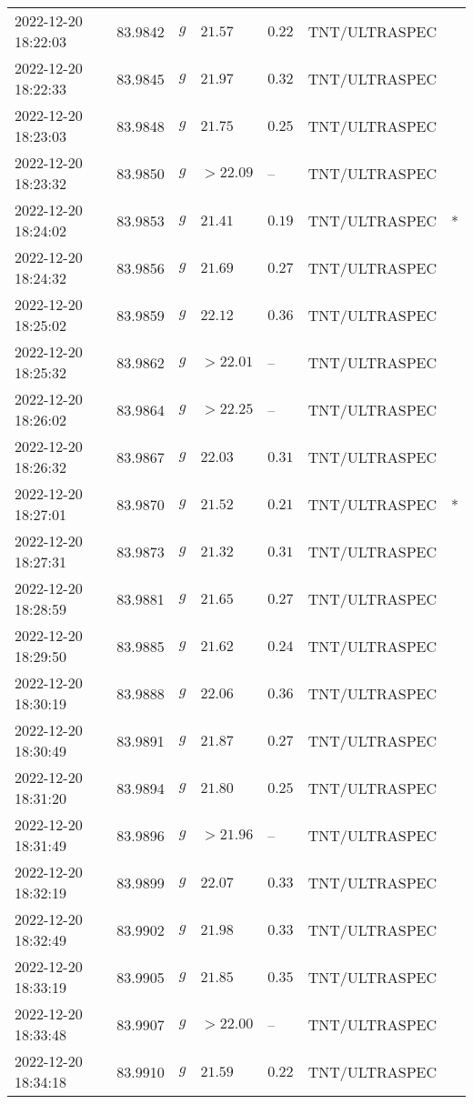 \documentclass{nature_plusfigure}
\begin{document}
\begin{supplement}
\begin{center}
\begin{longtable}{lllllll}
2022-12-20 18:22:03 & 83.9842 & $g$ & $21.57$ & $0.22$ & TNT/ULTRASPEC &  \\ 
2022-12-20 18:22:33 & 83.9845 & $g$ & $21.97$ & $0.32$ & TNT/ULTRASPEC &  \\ 
2022-12-20 18:23:03 & 83.9848 & $g$ & $21.75$ & $0.25$ & TNT/ULTRASPEC &  \\ 
2022-12-20 18:23:32 & 83.9850 & $g$ & $>22.09$ & -- & TNT/ULTRASPEC &  \\ 
2022-12-20 18:24:02 & 83.9853 & $g$ & $21.41$ & $0.19$ & TNT/ULTRASPEC & * \\ 
2022-12-20 18:24:32 & 83.9856 & $g$ & $21.69$ & $0.27$ & TNT/ULTRASPEC &  \\ 
2022-12-20 18:25:02 & 83.9859 & $g$ & $22.12$ & $0.36$ & TNT/ULTRASPEC &  \\ 
2022-12-20 18:25:32 & 83.9862 & $g$ & $>22.01$ & -- & TNT/ULTRASPEC &  \\ 
2022-12-20 18:26:02 & 83.9864 & $g$ & $>22.25$ & -- & TNT/ULTRASPEC &  \\ 
2022-12-20 18:26:32 & 83.9867 & $g$ & $22.03$ & $0.31$ & TNT/ULTRASPEC &  \\ 
2022-12-20 18:27:01 & 83.9870 & $g$ & $21.52$ & $0.21$ & TNT/ULTRASPEC & * \\ 
2022-12-20 18:27:31 & 83.9873 & $g$ & $21.32$ & $0.31$ & TNT/ULTRASPEC &  \\ 
2022-12-20 18:28:59 & 83.9881 & $g$ & $21.65$ & $0.27$ & TNT/ULTRASPEC &  \\ 
2022-12-20 18:29:50 & 83.9885 & $g$ & $21.62$ & $0.24$ & TNT/ULTRASPEC &  \\ 
2022-12-20 18:30:19 & 83.9888 & $g$ & $22.06$ & $0.36$ & TNT/ULTRASPEC &  \\ 
2022-12-20 18:30:49 & 83.9891 & $g$ & $21.87$ & $0.27$ & TNT/ULTRASPEC &  \\ 
2022-12-20 18:31:20 & 83.9894 & $g$ & $21.80$ & $0.25$ & TNT/ULTRASPEC &  \\ 
2022-12-20 18:31:49 & 83.9896 & $g$ & $>21.96$ & -- & TNT/ULTRASPEC &  \\ 
2022-12-20 18:32:19 & 83.9899 & $g$ & $22.07$ & $0.33$ & TNT/ULTRASPEC &  \\ 
2022-12-20 18:32:49 & 83.9902 & $g$ & $21.98$ & $0.33$ & TNT/ULTRASPEC &  \\ 
2022-12-20 18:33:19 & 83.9905 & $g$ & $21.85$ & $0.35$ & TNT/ULTRASPEC &  \\ 
2022-12-20 18:33:48 & 83.9907 & $g$ & $>22.00$ & -- & TNT/ULTRASPEC &  \\ 
2022-12-20 18:34:18 & 83.9910 & $g$ & $21.59$ & $0.22$ & TNT/ULTRASPEC &  \\ 

\end{longtable}
\end{center}
\end{supplement}
\end{document}
